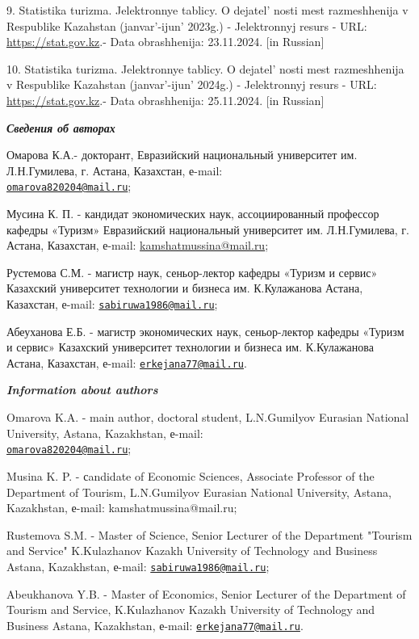 \begin{references}
9. Statistika turizma. Jelektronnye tablicy. O
dejatel' nosti mest razmeshhenija v Respublike Kazahstan
(janvar'-ijun'{} 2023g.) - Jelektronnyj
resurs - URL:
\href{https://stat.gov.kz/ru/industries/business-statistics/stat-tourism/spreadsheets/?year=2023&name}{https://stat.gov.kz}.-
Data obrashhenija: 23.11.2024. {[}in Russian{]}

10. Statistika turizma. Jelektronnye tablicy. O
dejatel' nosti mest razmeshhenija v Respublike Kazahstan
(janvar'-ijun'{} 2024g.) - Jelektronnyj
resurs - URL:
\href{https://stat.gov.kz/ru/industries/business-statistics/stat-tourism/spreadsheets/?year=2024&name}{https://stat.gov.kz}.-
Data obrashhenija: 25.11.2024. {[}in Russian{]}
\end{references}

\begin{authorinfo}
\hspace{1em}\emph{{\bfseries Сведения об авторах}}

Омарова К.А.- докторант, Евразийский национальный университет им.
Л.Н.Гумилева, г. Астана, Казахстан, е-mail:\\
\href{mailto:omarova820204@mail.ru}{\nolinkurl{omarova820204@mail.ru}};

Мусина К. П. - кандидат экономических наук, ассоциированный профессор
кафедры «Туризм» Евразийский национальный университет им. Л.Н.Гумилева,
г. Астана, Казахстан, е-mail:
\href{mailto:2kamshatmussina@mail.ru}{kamshatmussina@mail.ru};

Рустемова С.М. - магистр наук, сеньор-лектор кафедры «Туризм и сервис»
Казахский университет технологии и бизнеса им. К.Кулажанова Астана,
Казахстан, е-mail:
\href{mailto:sabiruwa1986@mail.ru}{\nolinkurl{sabiruwa1986@mail.ru}};

Абеуханова Е.Б. - магистр экономических наук, сеньор-лектор кафедры
«Туризм и сервис» Казахский университет технологии и бизнеса им.
К.Кулажанова Астана, Казахстан, е-mail:
\href{mailto:erkejana77@mail.ru}{\nolinkurl{erkejana77@mail.ru}}.

\hspace{1em}\emph{{\bfseries Information about authors}}

Omarova K.A. - main author, doctoral student, L.N.Gumilyov Eurasian
National University, Astana, Kazakhstan, е-mail:\\
\href{mailto:omarova820204@mail.ru}{\nolinkurl{omarova820204@mail.ru}};

Musina K. P. - сandidate of Economic Sciences, Associate Professor of
the Department of Tourism, L.N.Gumilyov Eurasian National University,
Astana, Kazakhstan, е-mail: kamshatmussina@mail.ru;

Rustemova S.M. - Master of Science, Senior Lecturer of the Department
"Tourism and Service" K.Kulazhanov Kazakh University of Technology and
Business Astana, Kazakhstan, е-mail:
\href{mailto:sabiruwa1986@mail.ru}{\nolinkurl{sabiruwa1986@mail.ru}};

Abeukhanova Y.B. - Master of Economics, Senior Lecturer of the
Department of Tourism and Service, K.Kulazhanov Kazakh University of
Technology and Business Astana, Kazakhstan, е-mail:
\href{mailto:erkejana77@mail.ru}{\nolinkurl{erkejana77@mail.ru}}.
\end{authorinfo}
